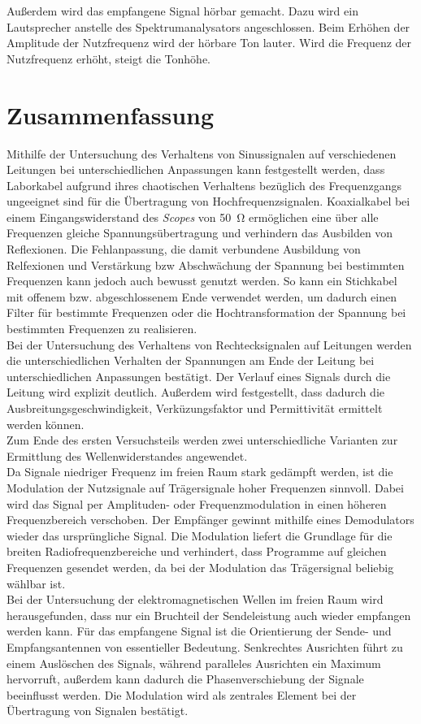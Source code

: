 \documentclass[a4paper,twoside,final]{article}
\begin{document}
Außerdem wird das empfangene Signal hörbar gemacht. Dazu wird ein Lautsprecher anstelle des Spektrumanalysators angeschlossen. Beim Erhöhen der Amplitude der Nutzfrequenz wird der hörbare Ton lauter. Wird die Frequenz der Nutzfrequenz erhöht, steigt die Tonhöhe.
\section{Zusammenfassung}
Mithilfe der Untersuchung des Verhaltens von Sinussignalen auf verschiedenen Leitungen bei unterschiedlichen Anpassungen kann festgestellt werden, dass Laborkabel aufgrund ihres chaotischen Verhaltens bezüglich des Frequenzgangs ungeeignet sind für die Übertragung von Hochfrequenzsignalen. Koaxialkabel bei einem Eingangswiderstand des \textit{Scopes} von \SI{50}{\ohm} ermöglichen eine über alle Frequenzen gleiche Spannungsübertragung und verhindern das Ausbilden von Reflexionen. Die Fehlanpassung, die damit verbundene Ausbildung von Relfexionen und Verstärkung bzw Abschwächung der Spannung bei bestimmten Frequenzen kann jedoch auch bewusst genutzt werden. So kann ein Stichkabel mit offenem bzw. abgeschlossenem Ende verwendet werden, um dadurch einen Filter für bestimmte Frequenzen oder die Hochtransformation der Spannung bei bestimmten Frequenzen zu realisieren. \\
Bei der Untersuchung des Verhaltens von Rechtecksignalen auf Leitungen werden die unterschiedlichen Verhalten der Spannungen am Ende der Leitung bei unterschiedlichen Anpassungen bestätigt. Der Verlauf eines Signals durch die Leitung wird explizit deutlich. Außerdem wird festgestellt, dass dadurch die Ausbreitungsgeschwindigkeit, Verküzungsfaktor und Permittivität ermittelt werden können.\\ Zum Ende des ersten Versuchsteils werden zwei unterschiedliche Varianten zur Ermittlung des Wellenwiderstandes angewendet.\\
Da Signale niedriger Frequenz im freien Raum stark gedämpft werden, ist die Modulation der Nutzsignale auf Trägersignale hoher Frequenzen sinnvoll. Dabei wird das Signal per Amplituden- oder Frequenzmodulation in einen höheren Frequenzbereich verschoben. Der Empfänger gewinnt mithilfe eines Demodulators wieder das ursprüngliche Signal. Die Modulation liefert die Grundlage für die breiten Radiofrequenzbereiche und verhindert, dass Programme auf gleichen Frequenzen gesendet werden, da bei der Modulation das Trägersignal beliebig wählbar ist.\\
Bei der Untersuchung der elektromagnetischen Wellen im freien Raum wird herausgefunden, dass nur ein Bruchteil der Sendeleistung auch wieder empfangen werden kann. Für das empfangene Signal ist die Orientierung der Sende- und Empfangsantennen von essentieller Bedeutung. Senkrechtes Ausrichten führt zu einem Auslöschen des Signals, während paralleles Ausrichten ein Maximum hervorruft, außerdem kann dadurch die Phasenverschiebung der Signale beeinflusst werden. Die Modulation wird als zentrales Element bei der Übertragung von Signalen bestätigt.
\end{document}
